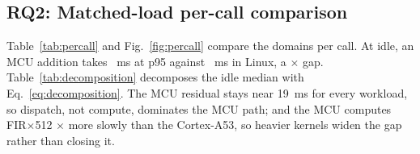 \documentclass[conference]{IEEEtran}
\begin{document}
\subsection{RQ2: Matched-load per-call comparison}
\label{sec:percall}
Table~\ref{tab:percall} and Fig.~\ref{fig:percall} compare the domains per
call. At idle, an MCU addition takes \StageTwelveIdleRtAddP~ms at p95 against
\StageTwelveIdleLinuxAddP~ms in Linux, a \StageTwelveIdleRatio$\times$ gap.
Table~\ref{tab:decomposition} decomposes the idle median with
Eq.~\eqref{eq:decomposition}. The MCU residual stays near 19~ms for every
workload, so dispatch, not compute, dominates the MCU path; and the MCU
computes FIR$\times$512 \StageTwelveFirComputeRatio$\times$ more slowly than
the Cortex-A53, so heavier kernels widen the gap rather than closing it.

\begin{table}[t]
\caption{Per-call p95 latency (ms) by load and caller policy. Brackets give
95\% block-bootstrap confidence intervals for the ordinary caller. ``FIFO''
denotes a \texttt{SCHED\_FIFO} priority-50 caller.}
\label{tab:percall}
\centering
\footnotesize

\end{table}
\end{document}
